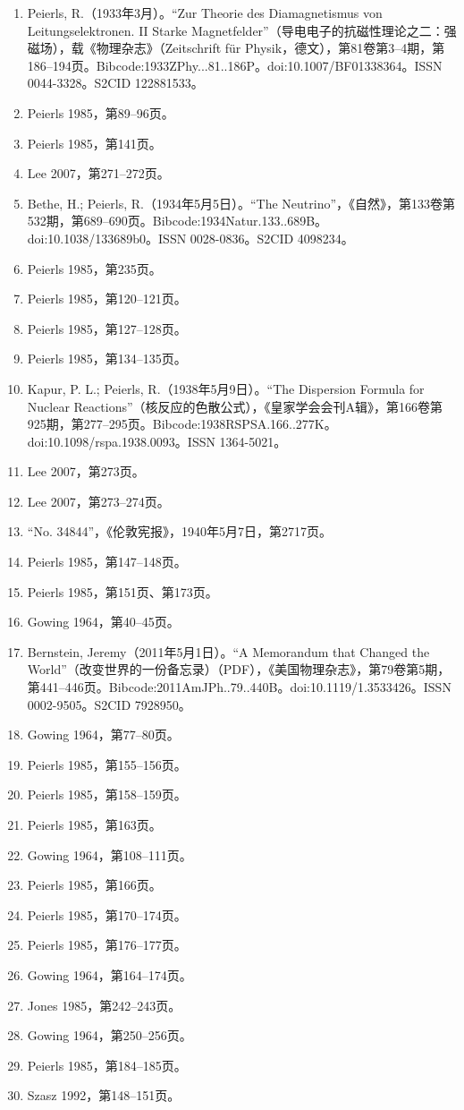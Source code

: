 \begin{enumerate}
\item Peierls, R.（1933年3月）。“Zur Theorie des Diamagnetismus von Leitungselektronen. II Starke Magnetfelder”（导电电子的抗磁性理论之二：强磁场），载《物理杂志》（Zeitschrift für Physik，德文），第81卷第3–4期，第186–194页。Bibcode:1933ZPhy...81..186P。doi:10.1007/BF01338364。ISSN 0044-3328。S2CID 122881533。
\item Peierls 1985，第89–96页。
\item Peierls 1985，第141页。
\item Lee 2007，第271–272页。
\item Bethe, H.; Peierls, R.（1934年5月5日）。“The Neutrino”，《自然》，第133卷第532期，第689–690页。Bibcode:1934Natur.133..689B。doi:10.1038/133689b0。ISSN 0028-0836。S2CID 4098234。
\item Peierls 1985，第235页。
\item Peierls 1985，第120–121页。
\item Peierls 1985，第127–128页。
\item Peierls 1985，第134–135页。
\item Kapur, P. L.; Peierls, R.（1938年5月9日）。“The Dispersion Formula for Nuclear Reactions”（核反应的色散公式），《皇家学会会刊A辑》，第166卷第925期，第277–295页。Bibcode:1938RSPSA.166..277K。doi:10.1098/rspa.1938.0093。ISSN 1364-5021。
\item Lee 2007，第273页。
\item Lee 2007，第273–274页。
\item “No. 34844”，《伦敦宪报》，1940年5月7日，第2717页。
\item Peierls 1985，第147–148页。
\item Peierls 1985，第151页、第173页。
\item Gowing 1964，第40–45页。
\item Bernstein, Jeremy（2011年5月1日）。“A Memorandum that Changed the World”（改变世界的一份备忘录）（PDF），《美国物理杂志》，第79卷第5期，第441–446页。Bibcode:2011AmJPh..79..440B。doi:10.1119/1.3533426。ISSN 0002-9505。S2CID 7928950。
\item Gowing 1964，第77–80页。
\item Peierls 1985，第155–156页。
\item Peierls 1985，第158–159页。
\item Peierls 1985，第163页。
\item Gowing 1964，第108–111页。
\item Peierls 1985，第166页。
\item Peierls 1985，第170–174页。
\item Peierls 1985，第176–177页。
\item Gowing 1964，第164–174页。
\item Jones 1985，第242–243页。
\item Gowing 1964，第250–256页。
\item Peierls 1985，第184–185页。
\item Szasz 1992，第148–151页。


\end{enumerate}
